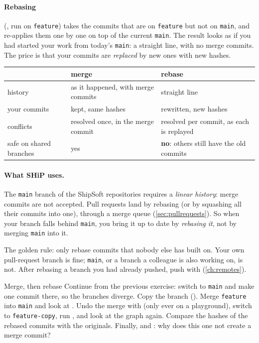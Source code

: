 \paragraph{Rebasing} (, run on \texttt{feature}) takes
the commits that are on \texttt{feature} but not on \texttt{main}, and
re-applies them one by one on top of the current \texttt{main}. The result
looks as if you had started your work from today's \texttt{main}: a straight
line, with no merge commits. The price is that your commits are
\emph{replaced} by new ones with new hashes.

\begin{center}\small
\begin{tabularx}{\linewidth}{l L L}
\toprule
 & merge & rebase \\
\midrule
history     & as it happened, with merge commits & straight line \\
your commits& kept, same hashes & rewritten, new hashes \\
conflicts   & resolved once, in the merge commit & resolved per commit, as each is replayed \\
safe on shared branches & yes & \textbf{no}: others still have the old commits \\
\bottomrule
\end{tabularx}
\end{center}

\paragraph{What SHiP uses.} The \texttt{main} branch of the ShipSoft
repositories requires a \emph{linear history}: merge commits are not
accepted. Pull requests land by rebasing (or by squashing all their commits
into one), through a merge queue (\cref{sec:pullrequests}). So when your
branch falls behind \texttt{main}, you bring it up to date by \emph{rebasing
it}, not by merging \texttt{main} into it.

\begin{pitfall}
The golden rule: only rebase commits that nobody else has built on. Your own
pull-request branch is fine; \texttt{main}, or a branch a colleague is also
working on, is not. After rebasing a branch you had already pushed, push with
 (\cref{ch:remotes}).
\end{pitfall}

\begin{exercise}{Merge, then rebase}
Continue from the previous exercise: switch to \texttt{main} and make one
commit there, so the branches diverge. Copy the branch
(). Merge \texttt{feature} into
\texttt{main} and look at . Undo the
merge with  (only ever on a
playground), switch to \texttt{feature-copy}, run , and
look at the graph again. Compare the hashes of the rebased commits with the
originals. Finally,  and
: why does this one not create a merge
commit?
\end{exercise}

